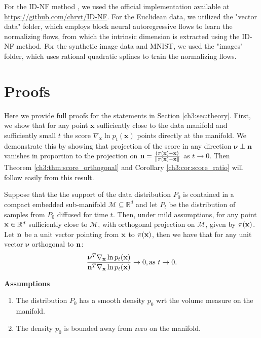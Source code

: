 For the ID-NF method \cite{horvat2022nfid}, we used the official implementation available at \url{https://github.com/chrvt/ID-NF}. For the Euclidean data, we utilized the "vector data" folder, which employs block neural autoregressive flows to learn the normalizing flows, from which the intrinsic dimension is extracted using the ID-NF method. For the synthetic image data and MNIST, we used the "images" folder, which uses rational quadratic splines to train the normalizing flows.

\section{Proofs}
\label{ch3:appendix:proof}
Here we provide full proofs for the statements in Section \ref{ch3:sec:theory}. First, we show that for any point $\textbf{x}$ sufficiently close to the data manifold and sufficiently small $t$ the score $\nabla_\textbf{x} \ln p_t(\textbf{x})$ points directly at the manifold. We demonstrate this by showing that projection of the score in any direction $\boldsymbol{\nu} \perp \textbf{n}$ vanishes in proportion to the projection on $\textbf{n} = \frac{(\pi(\textbf{x}) - \textbf{x})}{\left\lVert \pi(\textbf{x}) -\textbf{x} \right\rVert}$ as $t \to 0$. Then Theorem \ref{ch3:thm:score_orthogonal} and Corollary \ref{ch3:cor:score_ratio} will follow easily from this result.

\begin{theorem}
\label{ch3:thm:master_thm}
Suppose that the the support of the data distribution $P_0$ is contained in a compact embedded sub-manifold $\mathcal{M} \subseteq \mathbb{R}^d$ and let $P_t$ be the distribution of samples from $P_0$ diffused for time $t$. Then, under mild assumptions, for any point $\textup{\textbf{x}} \in \mathbb{R}^d$ sufficiently close to $\mathcal{M}$, with orthogonal projection on $\mathcal{M}$, given by $\pi(\textup{\textbf{x}})$. Let $\textup{\textbf{n}}$ be a unit vector pointing from $\textup{\textbf{x}}$ to $\pi(\textup{\textbf{x}})$, then we have that for any unit vector $\boldsymbol{\nu}$ orthogonal to $\textup{\textbf{n}}$: 
\begin{gather*}
    \frac{\boldsymbol{\nu}^T \nabla_\textup{\textbf{x}} \ln p_t(\textup{\textbf{x}})}{\textup{\textbf{n}}^T \nabla_\textup{\textbf{x}} \ln p_t(\textup{\textbf{x}})} \to 0, \text{as } t \to 0.
\end{gather*}
\end{theorem}

\textbf{Assumptions}
\begin{enumerate}
    \item The distribution $P_0$ has a smooth density $p_0$ wrt the volume measure on the manifold.
    \item The density $p_0$ is bounded away from zero on the manifold.
\end{enumerate}

